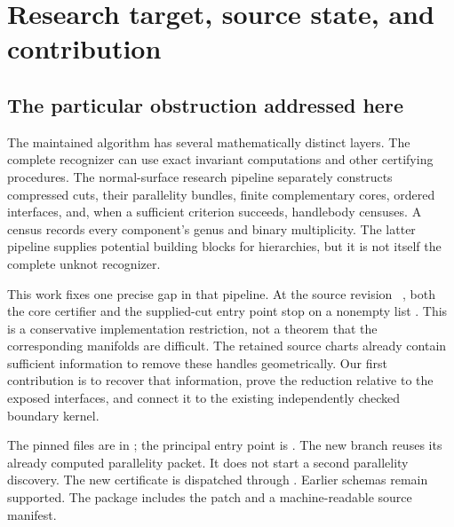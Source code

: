 \section{Research target, source state, and contribution}
\label{sec:scope}

\subsection{The particular obstruction addressed here}
The maintained algorithm has several mathematically distinct layers.
The complete recognizer can use exact invariant computations and other
certifying procedures.  The normal-surface research pipeline separately
constructs compressed cuts, their parallelity bundles, finite complementary
cores, ordered interfaces, and, when a sufficient criterion succeeds,
handlebody censuses.  A census records every component's genus and binary
multiplicity.  The latter pipeline supplies potential building blocks for
hierarchies, but it is not itself the complete unknot recognizer.

This work fixes one precise gap in that pipeline.  At the source revision
\basecommit\ \cite{ProveIt}, both the core certifier and the supplied-cut entry point
stop on a nonempty list .  This is a conservative implementation
restriction, not a theorem that the corresponding manifolds are difficult.
The retained source charts already contain sufficient information to
remove these handles geometrically.  Our first contribution is to recover
that information, prove the reduction relative to the exposed interfaces,
and connect it to the existing independently checked boundary kernel.

The pinned files are in
; the principal entry point is
.  The new branch reuses its already computed
parallelity packet.  It does not start a second parallelity discovery.
The new certificate is dispatched through
.  Earlier schemas remain supported.
The package includes the patch and a machine-readable source manifest.

